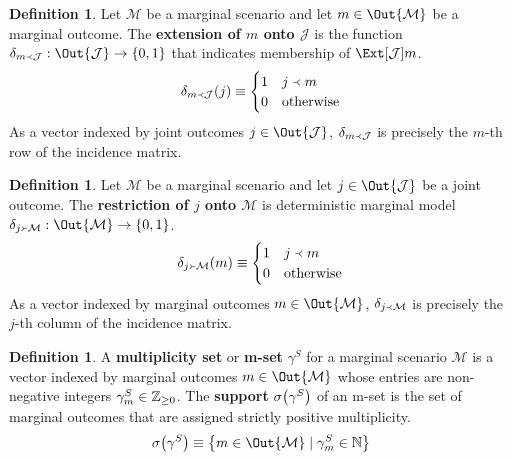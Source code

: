 \documentclass[aps, 10pt, english, twoside, pra, nofootinbib, longbibliography]{revtex4-1}
\theoremstyle{plain}
\theoremstyle{definition}
\newtheorem{definition}[theorem]{Definition}
\theoremstyle{remark}
\newcommand{\ext}{\mathrel{\Yleft}}
\newcommand{\res}{\mathrel{\Yright}}
\newcommand{\mscenario}{\mathcal{M}}
\newcommand{\jointvar}{\mathcal{J}}
\newcommand{\mset}[1]{\gamma^{#1}}
\newcommand{\supp}[1]{\si\br{#1}}
\newcommand{\term}[1]{\textcolor{Mahogany}{\textbf{#1}}}
\begin{document}
    \begin{definition}
        Let $\mscenario$ be a marginal scenario and let $m \in \Out{\mscenario}$ be a marginal outcome. The \term{extension of $m$ onto $\jointvar$} is the function $\de_{m \ext \jointvar} : \Out{\jointvar} \to \bc{0, 1}$ that indicates membership of $\Ext[\jointvar]{m}$.
        \[ \de_{m \ext \jointvar}\br{j} \defined \begin{cases}
            1 & j \ext m \\
            0 & \textrm{otherwise}
        \end{cases} \]
        As a vector indexed by joint outcomes $j \in \Out{\jointvar}$, $\de_{m \ext \jointvar}$ is precisely the $m$-th row of the incidence matrix.
    \end{definition}
    \begin{definition}
        Let $\mscenario$ be a marginal scenario and let $j \in \Out{\jointvar}$ be a joint outcome. The \term{restriction of $j$ onto $\mscenario$} is deterministic marginal model $\de_{j \res \mscenario} : \Out{\mscenario} \to \bc{0, 1}$.
        \[ \de_{j \res \mscenario}\br{m} \defined \begin{cases}
            1 & j \ext m  \\
            0 & \textrm{otherwise}
        \end{cases} \]
        As a vector indexed by marginal outcomes $m \in \Out{\mscenario}$, $\de_{j \ext \mscenario}$ is precisely the $j$-th column of the incidence matrix.
    \end{definition}



    \begin{definition}
        A \term{multiplicity set} or \term{m-set} $\mset{S}$ for a marginal scenario $\mscenario$ is a vector indexed by marginal outcomes $m \in \Out{\mscenario}$ whose entries are non-negative integers $\mset{S}_{m} \in \Z_{\geq 0}$. The \term{support} $\supp{\mset{S}}$ of an m-set is the set of marginal outcomes that are assigned strictly positive multiplicity.
        \[ \supp{\mset{S}} \defined \bc{m \in \Out{\mscenario} \mid \mset{S}_m \in \N} \]
    \end{definition}
\end{document}
